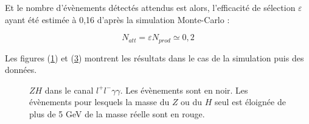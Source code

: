 \documentclass[11pt]{article} %
\begin{document}
Et le nombre d'évènements détectés attendus est alors, l'efficacité de sélection $\varepsilon$ ayant été estimée à 0,16 d'après la simulation Monte-Carlo :

\begin{equation}
N_{att} =\varepsilon N_{prod} \simeq 0,2
\end{equation}

Les figures (\ref{fig:mzh_mc}) et (\ref{fig:mzh_data}) montrent les résultats dans le cas de la simulation puis des données. 

\begin{figure}[H]
\begin{subfigure}[b]{.5\linewidth}
\label{fig:mzh_mc} 
 \resizebox{1.1\linewidth}{!}{}
\end{subfigure}%
\begin{subfigure}[b]{.5\linewidth}
\raggedright
\label{fig:mzh_data} 
 \resizebox{1.1\linewidth}{!}{}
\end{subfigure}
\caption{$ZH$ dans le canal $l^+l^-\gamma\gamma$. Les évènements sont en noir. Les évènements pour lesquels la masse du $Z$ ou du $H$ seul est éloignée de plus de 5 GeV de la masse réelle sont en rouge.}
\end{figure}



\theendnotes
\end{document}
